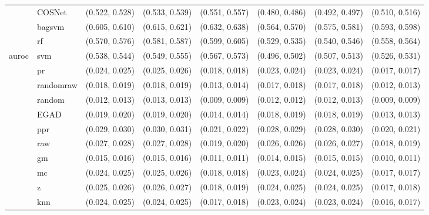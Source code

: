 \begin{table}[H]
{\begin{tabular}{llllllll}
 & COSNet & (0.522, 0.528) & (0.533, 0.539) & (0.551, 0.557) & (0.480, 0.486) & (0.492, 0.497) & (0.510, 0.516)\\

 & bagsvm & (0.605, 0.610) & (0.615, 0.621) & (0.632, 0.638) & (0.564, 0.570) & (0.575, 0.581) & (0.593, 0.598)\\

 & rf & (0.570, 0.576) & (0.581, 0.587) & (0.599, 0.605) & (0.529, 0.535) & (0.540, 0.546) & (0.558, 0.564)\\

\multirow{-15}{*}{\raggedright\arraybackslash auroc} & svm & (0.538, 0.544) & (0.549, 0.555) & (0.567, 0.573) & (0.496, 0.502) & (0.507, 0.513) & (0.526, 0.531)\\
\cmidrule{1-8}
 & pr & (0.024, 0.025) & (0.025, 0.026) & (0.018, 0.018) & (0.023, 0.024) & (0.023, 0.024) & (0.017, 0.017)\\

 & randomraw & (0.018, 0.019) & (0.018, 0.019) & (0.013, 0.014) & (0.017, 0.018) & (0.017, 0.018) & (0.012, 0.013)\\

 & random & (0.012, 0.013) & (0.013, 0.013) & (0.009, 0.009) & (0.012, 0.012) & (0.012, 0.013) & (0.009, 0.009)\\

 & EGAD & (0.019, 0.020) & (0.019, 0.020) & (0.014, 0.014) & (0.018, 0.019) & (0.018, 0.019) & (0.013, 0.013)\\

 & ppr & (0.029, 0.030) & (0.030, 0.031) & (0.021, 0.022) & (0.028, 0.029) & (0.028, 0.030) & (0.020, 0.021)\\

 & raw & (0.027, 0.028) & (0.027, 0.028) & (0.019, 0.020) & (0.026, 0.026) & (0.026, 0.027) & (0.018, 0.019)\\

 & gm & (0.015, 0.016) & (0.015, 0.016) & (0.011, 0.011) & (0.014, 0.015) & (0.015, 0.015) & (0.010, 0.011)\\

 & mc & (0.024, 0.025) & (0.025, 0.026) & (0.018, 0.018) & (0.023, 0.024) & (0.024, 0.025) & (0.017, 0.017)\\

 & z & (0.025, 0.026) & (0.026, 0.027) & (0.018, 0.019) & (0.024, 0.025) & (0.024, 0.025) & (0.017, 0.018)\\

 & knn & (0.024, 0.025) & (0.024, 0.025) & (0.017, 0.018) & (0.023, 0.024) & (0.023, 0.024) & (0.016, 0.017)\\


\end{tabular}}
\end{table}
